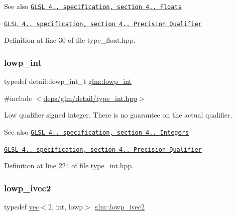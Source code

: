 \begin{DoxySeeAlso}{See also}
\href{http://www.opengl.org/registry/doc/GLSLangSpec.4.20.8.pdf}{\tt G\+L\+SL 4.. specification, section 4.. Floats} 

\href{http://www.opengl.org/registry/doc/GLSLangSpec.4.20.8.pdf}{\tt G\+L\+SL 4.. specification, section 4.. Precision Qualifier} 
\end{DoxySeeAlso}


Definition at line 30 of file type\+\_\+float.\+hpp.

\mbox{\label{group__core__precision_ga4681244bf4a184734f03aa9df4e3d288}} 
\subsubsection{\texorpdfstring{lowp\+\_\+int}{lowp\_int}}
{\footnotesize\ttfamily typedef detail\+::lowp\+\_\+int\+\_\+t \hyperlink{group__core__precision_ga4681244bf4a184734f03aa9df4e3d288}{glm\+::lowp\+\_\+int}}



{\ttfamily \#include $<$\hyperlink{type__int_8hpp}{deps/glm/detail/type\+\_\+int.\+hpp}$>$}

Low qualifier signed integer. There is no guarantee on the actual qualifier.

\begin{DoxySeeAlso}{See also}
\href{http://www.opengl.org/registry/doc/GLSLangSpec.4.20.8.pdf}{\tt G\+L\+SL 4.. specification, section 4.. Integers} 

\href{http://www.opengl.org/registry/doc/GLSLangSpec.4.20.8.pdf}{\tt G\+L\+SL 4.. specification, section 4.. Precision Qualifier} 
\end{DoxySeeAlso}


Definition at line 224 of file type\+\_\+int.\+hpp.

\mbox{\label{group__core__precision_gab85314d1bfbed099461a545d5fb75be1}} 
\subsubsection{\texorpdfstring{lowp\+\_\+ivec2}{lowp\_ivec2}}
{\footnotesize\ttfamily typedef \hyperlink{structglm_1_1vec}{vec}$<$2, int, lowp$>$ \hyperlink{group__core__precision_gab85314d1bfbed099461a545d5fb75be1}{glm\+::lowp\+\_\+ivec2}}




